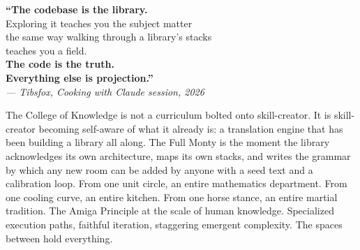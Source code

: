 \documentclass[11pt,letterpaper]{article}
\begin{document}
\newpage
\begin{quotebox}
\begin{center}
{\large\sffamily\bfseries\textcolor{primary}{``The codebase is the library.}}\\[0.5em]
{\large\sffamily\textcolor{primary}{Exploring it teaches you the subject matter}}\\[0.5em]
{\large\sffamily\textcolor{primary}{the same way walking through a library's stacks}}\\[0.5em]
{\large\sffamily\textcolor{primary}{teaches you a field.}}\\[0.5em]
{\large\sffamily\bfseries\textcolor{primary}{The code is the truth.\\[0.3em]Everything else is projection.''}}\\[1em]
{\normalsize\sffamily\itshape\textcolor{subtlegray}{--- Tibsfox, Cooking with Claude session, 2026}}
\end{center}
\vspace{0.5em}
\normalsize\sffamily\textcolor{darktext}{The College of Knowledge is not a curriculum bolted onto skill-creator. It is skill-creator becoming self-aware of what it already is: a translation engine that has been building a library all along. The Full Monty is the moment the library acknowledges its own architecture, maps its own stacks, and writes the grammar by which any new room can be added by anyone with a seed text and a calibration loop. From one unit circle, an entire mathematics department. From one cooling curve, an entire kitchen. From one horse stance, an entire martial tradition. The Amiga Principle at the scale of human knowledge. Specialized execution paths, faithful iteration, staggering emergent complexity. The spaces between hold everything.}
\end{quotebox}
\end{document}
